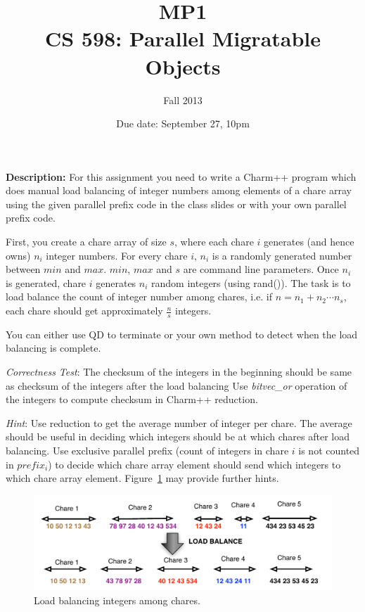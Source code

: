 \documentclass{article}
\title{MP1 \\ CS 598: Parallel Migratable Objects}
\author{Fall 2013}
\date{Due date: September 27, 10pm}
\begin{document}
\maketitle

\textbf{Description:} 
For this assignment you need to write a Charm++ program which does manual load
balancing of integer numbers among elements of a chare array using the 
given parallel prefix code in the class slides or with your own parallel 
prefix code. 

First, you create a chare array of size $s$, where each chare $i$ generates 
(and hence owns) $n_i$ integer numbers. For every chare $i$, $n_i$ is a 
randomly generated number between $min$ and $max$. 
$min$, $max$ and $s$ are command line parameters. 
Once $n_i$ is generated, chare $i$ generates $n_i$ random 
integers (using rand()). The task is to load balance the count
of integer number among chares, i.e. if $n = n_1 + n_2 \cdots n_s$,
each chare should get approximately $\frac{n}{s}$ integers.

You can either use QD to terminate or your own method to detect when
the load balancing is complete.

\emph{Correctness Test}: The checksum of the integers in the beginning
should be same as checksum of the integers after the load balancing
Use \emph{bitvec\_or} operation of the integers to compute checksum in Charm++
reduction.

\emph{Hint}: Use reduction to get the average number of integer per chare. 
The average should be useful in deciding which integers should be at which chares
after load balancing. Use exclusive parallel prefix (count of integers in chare $i$
is not counted in $prefix_i $) to decide which chare array element 
should send which integers to which chare array element. Figure~\ref{prefix}
may provide further hints.

\begin{figure}
\centering
\includegraphics[width=\textwidth]{prob1.pdf}
\caption{Load balancing integers among chares.}
\label{prefix}
\end{figure}
\end{document}
